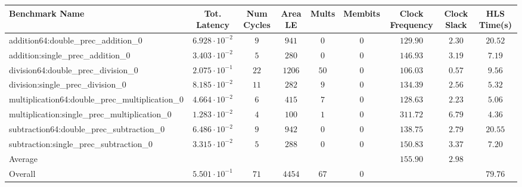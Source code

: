 \begin{tabular}{|l|c|c|c|c|c|c|c|c|}
\hline
Benchmark Name                                   & Tot. Latency            & Num Cycles & Area LE  & Mults  & Membits & Clock Frequency & Clock Slack & HLS Time(s) \\
\hline
addition64:double\_prec\_addition\_0             & $ 6.928 \cdot 10^{-2} $ & $ 9      $ & $ 941  $ & $ 0  $ & $ 0   $ & $ 129.90      $ & $ 2.30    $ & $ 20.52   $ \\
addition:single\_prec\_addition\_0               & $ 3.403 \cdot 10^{-2} $ & $ 5      $ & $ 280  $ & $ 0  $ & $ 0   $ & $ 146.93      $ & $ 3.19    $ & $ 7.19    $ \\
division64:double\_prec\_division\_0             & $ 2.075 \cdot 10^{-1} $ & $ 22     $ & $ 1206 $ & $ 50 $ & $ 0   $ & $ 106.03      $ & $ 0.57    $ & $ 9.56    $ \\
division:single\_prec\_division\_0               & $ 8.185 \cdot 10^{-2} $ & $ 11     $ & $ 282  $ & $ 9  $ & $ 0   $ & $ 134.39      $ & $ 2.56    $ & $ 5.32    $ \\
multiplication64:double\_prec\_multiplication\_0 & $ 4.664 \cdot 10^{-2} $ & $ 6      $ & $ 415  $ & $ 7  $ & $ 0   $ & $ 128.63      $ & $ 2.23    $ & $ 5.06    $ \\
multiplication:single\_prec\_multiplication\_0   & $ 1.283 \cdot 10^{-2} $ & $ 4      $ & $ 100  $ & $ 1  $ & $ 0   $ & $ 311.72      $ & $ 6.79    $ & $ 4.36    $ \\
subtraction64:double\_prec\_subtraction\_0       & $ 6.486 \cdot 10^{-2} $ & $ 9      $ & $ 942  $ & $ 0  $ & $ 0   $ & $ 138.75      $ & $ 2.79    $ & $ 20.55   $ \\
subtraction:single\_prec\_subtraction\_0         & $ 3.315 \cdot 10^{-2} $ & $ 5      $ & $ 288  $ & $ 0  $ & $ 0   $ & $ 150.83      $ & $ 3.37    $ & $ 7.20    $ \\
\hline
Average                                          & $                     $ & $        $ & $      $ & $    $ & $     $ & $ 155.90      $ & $ 2.98    $ & $         $ \\
\hline
Overall                                          & $ 5.501 \cdot 10^{-1} $ & $ 71     $ & $ 4454 $ & $ 67 $ & $ 0   $ & $             $ & $         $ & $ 79.76   $ \\
\hline
\end{tabular}
